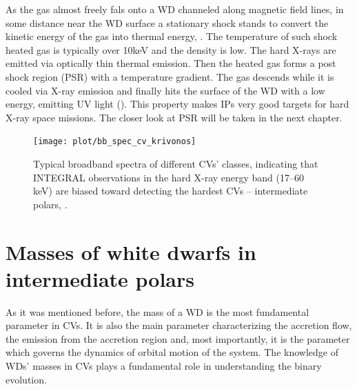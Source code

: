 \documentclass[oneside,a4paper,11pt]{report}
\begin{document}
As the gas almost freely fals onto a WD channeled along magnetic field lines, in some distance near the 
WD surface a stationary shock stands to convert the kinetic energy of the gas into thermal energy, 
\citet{2010A&A...520A..25Y}.
The temperature of such shock heated gas is typically over 10keV and the density is low. The hard X-rays 
are emitted via optically thin thermal emission. Then the heated gas forms a post shock region (PSR) 
with a temperature gradient. The gas descends while it is cooled via X-ray emission and finally hits 
the surface of the WD with a low energy, emitting UV light (\citet{1973PThPh..49.1184A_aizu}). 
This property makes IPs very good targets for hard X-ray space missions. The closer look at PSR 
will be taken in the next chapter.   

\begin{figure}[hbt]
\centering
\texttt{[image: plot/bb\_spec\_cv\_krivonos]}
\caption{Typical broadband spectra of different CVs' classes, indicating that INTEGRAL observations in 
the hard X-ray energy band (17--60 keV) are biased toward detecting the hardest CVs -- intermediate polars, 
\citet{2008A&A...489.1121R}.}
\label{kriv_1} 
\end{figure}


\chapter{Masses of white dwarfs in intermediate polars}
As it was mentioned before, the mass of a WD is the most fundamental parameter in CVs. It is also the 
main parameter characterizing the accretion flow, the emission from the accretion region and, most 
importantly, it is the parameter which governs the dynamics of orbital motion of the system. The 
knowledge of WDs' masses in CVs plays a fundamental role in understanding the binary evolution. 
\end{document}
